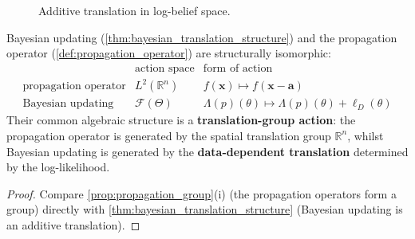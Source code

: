 \begin{figure}[htbp]
\centering
{}
\caption{Additive translation in log-belief space.}
\label{fig:bayesian_translation}
\end{figure}

\begin{corollary}\label{cor:bayesian_propagation_isomorphism}
Bayesian updating (\cref{thm:bayesian_translation_structure}) and the propagation operator (\cref{def:propagation_operator}) are structurally isomorphic:
\[
\begin{array}{c|c|c}
& \text{action space} & \text{form of action} \\ \hline
\text{propagation operator} & L^2(\mathbb{R}^n) & f(\mathbf{x})\mapsto f(\mathbf{x}-\mathbf{a}) \\
\text{Bayesian updating} & \mathcal{F}(\Theta) & \Lambda(p)(\theta)\mapsto \Lambda(p)(\theta)+\ell_D(\theta)
\end{array}
\]
Their common algebraic structure is a \textbf{translation-group action}: the propagation operator is generated by the spatial translation group $\mathbb{R}^n$, whilst Bayesian updating is generated by the \textbf{data-dependent translation} determined by the log-likelihood.
\end{corollary}

\begin{proof}
Compare \cref{prop:propagation_group}(i) (the propagation operators form a group) directly with \cref{thm:bayesian_translation_structure} (Bayesian updating is an additive translation).
\end{proof}

